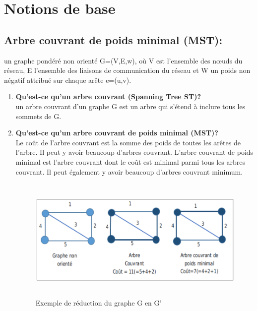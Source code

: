 \section{Notions de base}

\subsection{Arbre couvrant de poids minimal (MST):}
un graphe pondéré non orienté G=(V,E,w), où V est l’ensemble des nœuds du réseau, E l’ensemble des liaisons de communication du réseau et W un poids non négatif attribué sur chaque arête e=(u,v).\\


\begin{enumerate}[label=\alph*)]

	\item \textbf{Qu'est-ce qu'un arbre couvrant (Spanning Tree ST)?}\\
	un arbre couvrant d’un graphe G est un arbre qui s'étend à inclure tous les sommets de G.

	\item \textbf{Qu'est-ce qu'un arbre couvrant de poids minimal (MST)?}\\
	Le coût de l'arbre couvrant est la somme des poids de toutes les arêtes de l'arbre. Il peut y avoir beaucoup d'arbres couvrant. L’arbre couvrant de poids minimal est l'arbre couvrant dont le coût est minimal parmi tous les arbres couvrant. Il peut également y avoir beaucoup d'arbres couvrant minimum.\\

\begin{figure}[H]
	\centering
	\includegraphics[width=15cm,height=6cm]{Chap3/2.png}
	\caption{Exemple de réduction du graphe G en G’}
	\label{fig:32}
\end{figure}

\end{enumerate}
	
